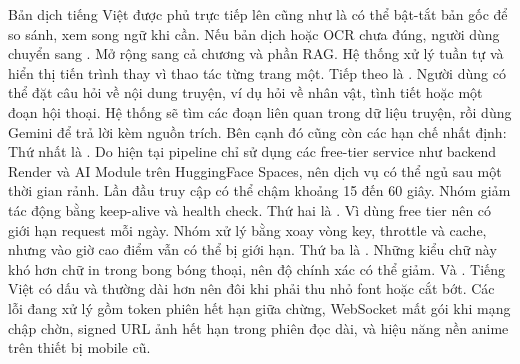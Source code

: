\markdownRendererInterblockSeparator
{}Bản dịch tiếng Việt được phủ trực tiếp lên cũng như là có thể bật-tắt bản gốc để so sánh, xem song ngữ khi cần.\markdownRendererParagraphSeparator
{}Nếu bản dịch hoặc OCR chưa đúng, người dùng chuyển sang .\markdownRendererInterblockSeparator
{}
\markdownRendererSectionEnd \markdownRendererSectionBegin
{}\markdownRendererInterblockSeparator
{}Mở rộng sang cả chương và phần RAG.\markdownRendererParagraphSeparator
{}Hệ thống xử lý tuần tự và hiển thị tiến trình thay vì thao tác từng trang một.\markdownRendererParagraphSeparator
{}Tiếp theo là . Người dùng có thể đặt câu hỏi về nội dung truyện, ví dụ hỏi về nhân vật, tình tiết hoặc một đoạn hội thoại. Hệ thống sẽ tìm các đoạn liên quan trong dữ liệu truyện, rồi dùng Gemini để trả lời kèm nguồn trích.\markdownRendererInterblockSeparator
{}
\markdownRendererSectionEnd \markdownRendererSectionBegin
{}\markdownRendererInterblockSeparator
{}Bên cạnh đó cũng còn các hạn chế nhất định:\markdownRendererParagraphSeparator
{}Thứ nhất là . Do hiện tại pipeline chỉ sử dụng các free-tier service như backend Render và AI Module trên HuggingFace Spaces, nên dịch vụ có thể ngủ sau một thời gian rảnh. Lần đầu truy cập có thể chậm khoảng 15 đến 60 giây. Nhóm giảm tác động bằng keep-alive và health check.\markdownRendererParagraphSeparator
{}Thứ hai là . Vì dùng free tier nên có giới hạn request mỗi ngày. Nhóm xử lý bằng xoay vòng key, throttle và cache, nhưng vào giờ cao điểm vẫn có thể bị giới hạn.\markdownRendererParagraphSeparator
{}Thứ ba là . Những kiểu chữ này khó hơn chữ in trong bong bóng thoại, nên độ chính xác có thể giảm.\markdownRendererParagraphSeparator
{}Và . Tiếng Việt có dấu và thường dài hơn nên đôi khi phải thu nhỏ font hoặc cắt bớt.\markdownRendererParagraphSeparator
{}Các lỗi đang xử lý gồm token phiên hết hạn giữa chừng, WebSocket mất gói khi mạng chập chờn, signed URL ảnh hết hạn trong phiên đọc dài, và hiệu năng nền anime trên thiết bị mobile cũ.\markdownRendererInterblockSeparator
